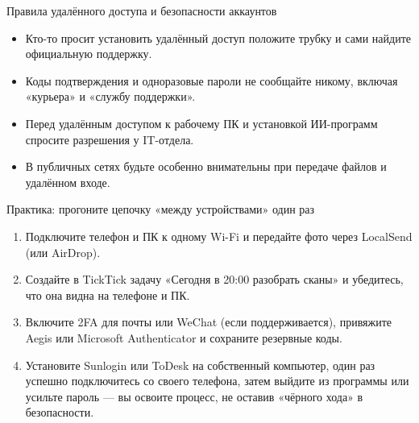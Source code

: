 \begin{tcbwarn}{Правила удалённого доступа и безопасности аккаунтов}
\begin{itemize}
  \item Кто-то просит установить удалённый доступ положите трубку и сами найдите официальную поддержку.
  \item Коды подтверждения и одноразовые пароли не сообщайте никому, включая «курьера» и «службу поддержки».
  \item Перед удалённым доступом к рабочему ПК и установкой ИИ-программ спросите разрешения у IT-отдела.
  \item В публичных сетях будьте особенно внимательны при передаче файлов и удалённом входе.
\end{itemize}

\end{tcbwarn}

\begin{tcbpractice}{Практика: прогоните цепочку «между устройствами» один раз}
\begin{enumerate}
  \item Подключите телефон и ПК к одному Wi-Fi и передайте фото через LocalSend (или AirDrop).
  \item Создайте в TickTick задачу «Сегодня в 20:00 разобрать сканы» и убедитесь, что она видна на телефоне и ПК.
  \item Включите 2FA для почты или WeChat (если поддерживается), привяжите Aegis или Microsoft Authenticator и сохраните резервные коды.
  \item Установите Sunlogin или ToDesk на собственный компьютер, один раз успешно подключитесь со своего телефона, затем выйдите из программы или усильте пароль — вы освоите процесс, не оставив «чёрного хода» в безопасности.
\end{enumerate}

\end{tcbpractice}

